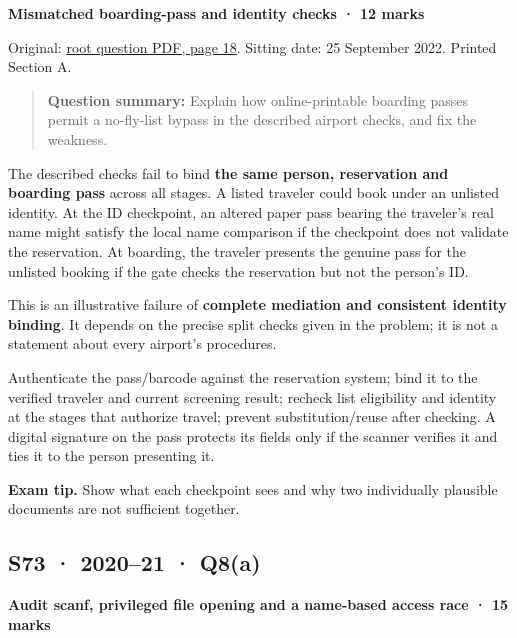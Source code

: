 \documentclass[11pt,a4paper]{article}
\begin{document}
\textbf{Mismatched boarding-pass and identity checks · 12 marks}


Original: \href{../../CSE405-Security_Merged.pdf\#page=18}{root question PDF,\allowbreak{} page 18}. Sitting date: 25 September 2022. Printed Section A.



\begin{quote}\small

\textbf{Question summary:} Explain how online-printable boarding passes permit a no-fly-list bypass in the described airport checks,\allowbreak{} and fix the weakness.



\end{quote}

The described checks fail to bind \textbf{the same person,\allowbreak{} reservation and boarding pass} across all stages. A listed traveler could book under an unlisted identity. At the ID checkpoint,\allowbreak{} an altered paper pass bearing the traveler's real name might satisfy the local name comparison if the checkpoint does not validate the reservation. At boarding,\allowbreak{} the traveler presents the genuine pass for the unlisted booking if the gate checks the reservation but not the person's ID.


This is an illustrative failure of \textbf{complete mediation and consistent identity binding}. It depends on the precise split checks given in the problem; it is not a statement about every airport's procedures.


Authenticate the pass/\allowbreak{}barcode against the reservation system; bind it to the verified traveler and current screening result; recheck list eligibility and identity at the stages that authorize travel; prevent substitution/\allowbreak{}reuse after checking. A digital signature on the pass protects its fields only if the scanner verifies it and ties it to the person presenting it.



{\color{ForestGreen}\textbf{Exam tip.} Show what each checkpoint sees and why two individually plausible documents are not sufficient together.}




\clearpage
\subsection{S73 · 2020–21 · Q8(a)}\label{s73}

\textbf{Audit scanf,\allowbreak{} privileged file opening and a name-based access race · 15 marks}
\end{document}
